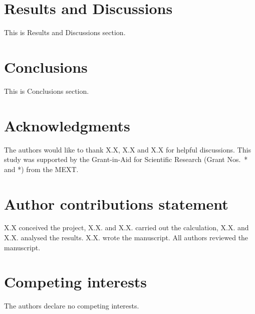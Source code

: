 \documentclass[aps,prl,twocolumn,superscriptaddress,showpacs]{revtex4-2}
\begin{document}
\section*{Results and Discussions}
This is Results and Discussions section.

\section*{Conclusions}
This is Conclusions section.



\section*{Acknowledgments}
The authors would like to thank X.X, X.X and X.X for helpful discussions.
This study was supported by the Grant-in-Aid for Scientific Research (Grant Nos.~* and *) from the MEXT.

\section*{Author contributions statement}
X.X conceived the project, X.X. and X.X. carried out the calculation, X.X. and X.X. analysed the results.
X.X. wrote the manuscript.
All authors reviewed the manuscript.

\section*{Competing interests}
The authors declare no competing interests.


\end{document}
